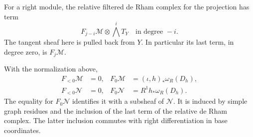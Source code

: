 For a right module, the relative filtered de Rham complex for the
projection has term
\begin{equation}\label{bl:hod:relative-dr}
 F_{j-i}\mathcal M\otimes\bigwedge^i T_Y
 \quad\text{in degree }-i.
\end{equation}
The tangent sheaf here is pulled back from $Y$. In particular its
last term, in degree zero, is $F_j\mathcal M$.

\begin{lemma}\label{bl:lem:lowest-piece}
With the normalization above,
\begin{align}
 F_{<0}\mathcal M&=0,&
 F_0\mathcal M&=(\iota,h)_*\omega_R(D_h),
 \label{bl:hod:lowest-source}\\
 F_{<0}\mathcal N&=0,&
 F_0\mathcal N&=R^1h_*\omega_R(D_h).
 \label{bl:hod:lowest-target}
\end{align}
The equality for $F_0\mathcal N$ identifies it with a subsheaf of $\mathcal N$.
It is induced by simple graph residues and the inclusion of the
last term of the relative de Rham complex. The latter inclusion
commutes with right differentiation in base coordinates.
\end{lemma}

